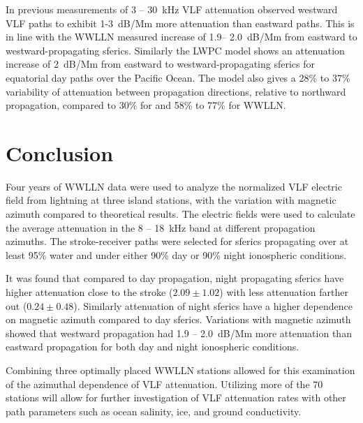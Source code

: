 In previous measurements of 3 -- 30~kHz VLF attenuation \citet{Taylor1960a} observed westward VLF paths to exhibit 1-3~dB/Mm more attenuation than eastward paths.
This is in line with the WWLLN measured increase of 1.9-- 2.0~dB/Mm from eastward to westward-propagating sferics.
Similarly the LWPC model shows an attenuation increase of 2~dB/Mm from eastward to westward-propagating sferics for equatorial day paths over the Pacific Ocean.
The model also gives a 28\% to 37\% variability of attenuation between propagation directions, relative to northward propagation, compared to 30\% for \citet{Wait1960a} and 58\% to 77\% for WWLLN.

\section{Conclusion}

Four years of WWLLN data were used to analyze the normalized VLF electric field from lightning at three island stations, with the variation with magnetic azimuth compared to theoretical results.
The electric fields were used to calculate the average attenuation in the 8 -- 18~kHz band at different propagation azimuths.
The stroke-receiver paths were selected for sferics propagating over at least 95\% water and under either 90\% day or 90\% night ionospheric conditions.

It was found that compared to day propagation, night propagating sferics have higher attenuation close to the stroke ($2.09\pm1.02$) with less attenuation farther out ($0.24\pm0.48$).
Similarly attenuation of night sferics have a higher dependence on magnetic azimuth compared to day sferics.
Variations with magnetic azimuth showed that westward propagation had 1.9 -- 2.0~dB/Mm more attenuation than eastward propagation for both day and night ionospheric conditions.

Combining three optimally placed WWLLN stations allowed for this examination of the azimuthal dependence of VLF attenuation.
Utilizing more of the 70 stations will allow for further investigation of VLF attenuation rates with other path parameters such as ocean salinity, ice, and ground conductivity.
